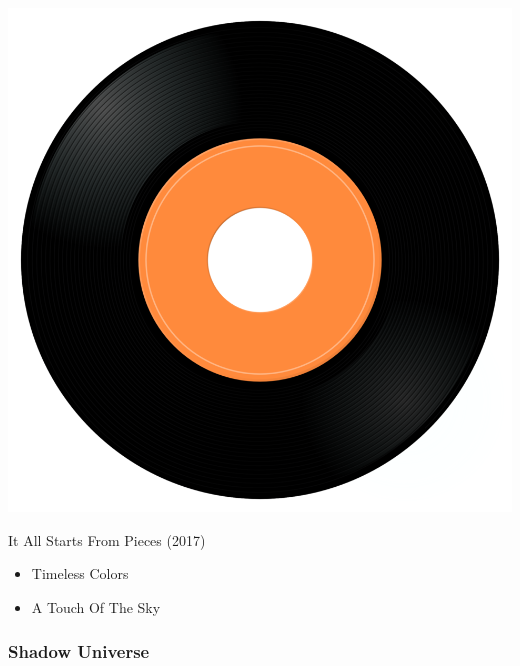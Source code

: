 \begin{minipage}[t]{0.25\textwidth}
\captionsetup{type=figure}
\includegraphics[width=\textwidth]{Images/cover.png}
\caption*{It All Starts From Pieces (2017)}
\end{minipage}
\begin{minipage}[t]{0.25\textwidth}\vspace{0pt}
\begin{itemize}[nosep,leftmargin=1em,labelwidth=*,align=left]
	\setlength{\itemsep}{0pt}
	\item Timeless Colors
	\item A Touch Of The Sky
\end{itemize}
\end{minipage}

\subsubsection{Shadow Universe}

